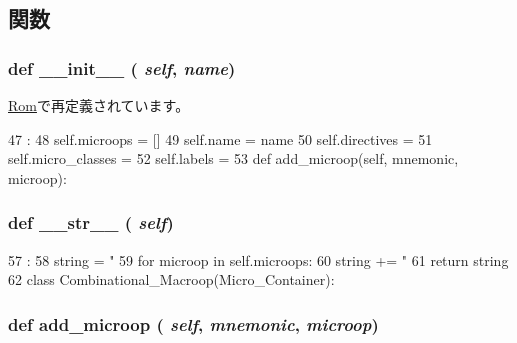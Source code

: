 \subsection{関数}
\hypertarget{classmicro__asm_1_1Micro__Container_ac775ee34451fdfa742b318538164070e}{
\subsubsection[{\_\-\_\-init\_\-\_\-}]{\setlength{\rightskip}{0pt plus 5cm}def \_\-\_\-init\_\-\_\- ( {\em self}, \/   {\em name})}}
\label{classmicro__asm_1_1Micro__Container_ac775ee34451fdfa742b318538164070e}


\hyperlink{classmicro__asm_1_1Rom_ac775ee34451fdfa742b318538164070e}{Rom}で再定義されています。


\begin{DoxyCode}
47                             :
48         self.microops = []
49         self.name = name
50         self.directives = {}
51         self.micro_classes = {}
52         self.labels = {}
53 
    def add_microop(self, mnemonic, microop):
\end{DoxyCode}
\hypertarget{classmicro__asm_1_1Micro__Container_aa7a4b9bc0941308e362738503137460e}{
\subsubsection[{\_\-\_\-str\_\-\_\-}]{\setlength{\rightskip}{0pt plus 5cm}def \_\-\_\-str\_\-\_\- ( {\em self})}}
\label{classmicro__asm_1_1Micro__Container_aa7a4b9bc0941308e362738503137460e}



\begin{DoxyCode}
57                      :
58         string = "%
59         for microop in self.microops:
60             string += "  %
61         return string
62 
class Combinational_Macroop(Micro_Container):
\end{DoxyCode}
\hypertarget{classmicro__asm_1_1Micro__Container_a123ef44f557360cbb23e994b58608bd8}{
\subsubsection[{add\_\-microop}]{\setlength{\rightskip}{0pt plus 5cm}def add\_\-microop ( {\em self}, \/   {\em mnemonic}, \/   {\em microop})}}
\label{classmicro__asm_1_1Micro__Container_a123ef44f557360cbb23e994b58608bd8}



